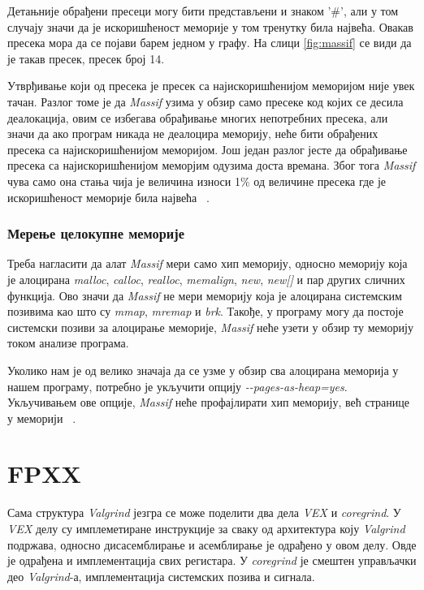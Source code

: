 \documentclass[12pt,oneside]{memoir}
\begin{document}
\indent Детањније обрађени пресеци могу бити представљени и знаком '\#', али у том случају значи да је искоришћеност меморије у том тренутку била највећа. Овакав пресека мора да се појави барем једном у графу. На слици \ref{fig:massif} се види да је такав пресек, пресек број 14.

\indent Утврђивање који од пресека је пресек са најискоришћенијом меморијом није увек тачан. Разлог томе је да \textit{Massif} узима у обзир само пресеке код којих се десила деалокација, овим се избегава обрађивање многих непотребних пресека, али значи да ако програм никада не деалоцира меморију, неће бити обрађених пресека са најискоришћенијом меморијом. Још један разлог јесте да обрађивање пресека са најискоришћенијом меморјим одузима доста времана. Због тога \textit{Massif} чува само она стања чија је величина износи 1\% од величине пресека где је искоришћеност меморије била највећа ~\cite{massifdRef}. 

\subsection{Мерење целокупне меморије}


\indent Треба нагласити да алат \textit{Massif} мери само хип меморију, односно меморију која је алоцирана \textit{malloc}, \textit{calloc}, \textit{realloc}, \textit{memalign}, \textit{new}, \textit{new[]} и пар других сличних функција. Ово значи да \textit{Massif} не мери меморију која је алоцирана системским позивима као што су \textit{mmap}, \textit{mremap} и \textit{brk}. Такође, у програму могу да постоје системски позиви за алоцирање меморије, \textit{Massif} неће узети у обзир ту меморију током анализе програма.

\indent Уколико нам је од велико значаја да се узме у обзир сва алоцирана меморија у нашем програму, потребно је укључити опцију \textit{-\--pages-as-heap=yes}. Укључивањем ове опције, \textit{Massif} неће профајлирати хип меморију, већ странице у меморији ~\cite{massifdRef}. 


\chapter{FPXX}
\label{chp:fpxx}

\indent Сама структура \textit{Valgrind} језгра се може поделити два дела \textit{VEX} и \textit{coregrind}. У \textit{VEX} делу су имплеметиране инструкције за сваку од архитектура коју \textit{Valgrind} подржава, односно дисасемблирање и асемблирање је одрађено у овом делу. Овде је одрађена и имплементација свих регистара. У \textit{coregrind} је смештен управљачки део \textit{Valgrind}-а, имплементација системских позива и сигнала.
\end{document}
